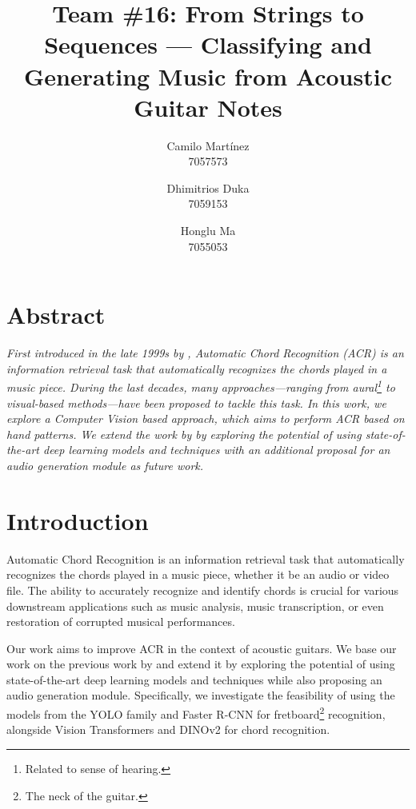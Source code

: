 \documentclass[10pt,twocolumn,letterpaper]{article}
\begin{document}
\newcommand{\dhimitrios}[1]{\textcolor{red}{Dhimitrios: #1}}

\title{Team \#16: From Strings to Sequences --- Classifying and Generating Music from Acoustic Guitar Notes}


\author{
    Camilo Martínez\\
    7057573\\
    \and
    Dhimitrios Duka\\
    7059153\\
    \and
    Honglu Ma\\
    7055053\\
}
\maketitle

\section{Abstract}
\emph{First introduced in the late 1999s by \cite{takuya1999realtime}, Automatic Chord Recognition (ACR) is an information retrieval task that automatically recognizes the chords played in a music piece. During the last decades, many approaches—ranging from aural\footnote{Related to sense of hearing.} to visual-based methods—have been proposed to tackle this task. In this work, we explore a Computer Vision based approach, which aims to perform ACR based on hand patterns. We extend the work by \cite{Kristian_Zaman_Tenoyo_Jodhinata_2024} by exploring the potential of using state-of-the-art deep learning models and techniques with an additional proposal for an audio generation module as future work.}

\section{Introduction}
Automatic Chord Recognition is an information retrieval task that automatically recognizes the chords played in a music piece, whether it be an audio or video file. The ability to accurately recognize and identify chords is crucial for various downstream applications such as music analysis, music transcription, or even restoration of corrupted musical performances.

Our work aims to improve ACR in the context of acoustic guitars. We base our work on the previous work by \cite{Kristian_Zaman_Tenoyo_Jodhinata_2024} and extend it by exploring the potential of using state-of-the-art deep learning models and techniques while also proposing an audio generation module. Specifically, we investigate the feasibility of using the models from the YOLO \cite{redmon2016you} family and Faster R-CNN \cite{ren2016faster} for fretboard\footnote{The neck of the guitar.} recognition, alongside Vision Transformers \cite{dosovitskiy2020image} and DINOv2 \cite{oquab2023dinov2} for chord recognition. 
\end{document}
